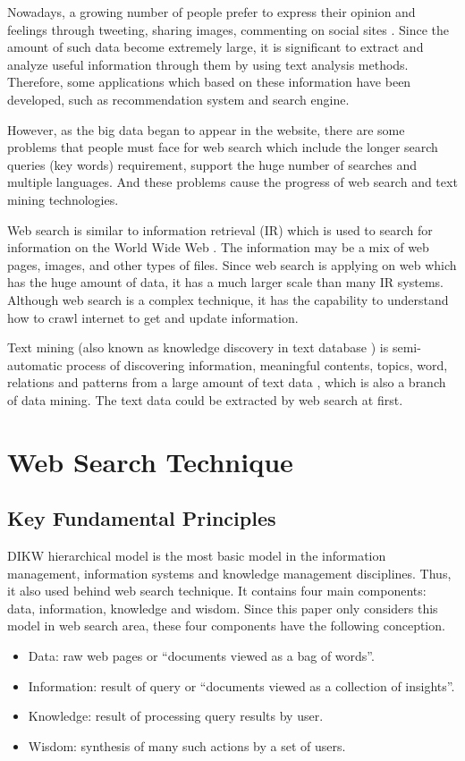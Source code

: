 \documentclass[sigconf]{acmart}
\begin{document}
Nowadays, a growing number of people prefer to express their opinion and feelings through tweeting, sharing images, commenting on social sites \cite{editor01}. Since the amount of such data become extremely large, it is significant to extract and analyze useful information through them by using text analysis methods. Therefore, some applications which based on these information have been developed, such as recommendation system and search engine.

However, as the big data began to appear in the website, there are some problems that people must face for web search which include the longer search queries (key words) requirement, support the huge number of searches and multiple languages. And these problems cause the progress of web search and text mining technologies.

Web search is similar to information retrieval (IR) which is used to search for information on the World Wide Web \cite{editor05}. The information may be a mix of web pages, images, and other types of files. Since web search is applying on web which has the huge amount of data, it has a much larger scale than many IR systems. Although web search is a complex technique, it has the capability to understand how to crawl internet to get and update information.

Text mining (also known as knowledge discovery in text database \cite{editor04}) is semi-automatic process of discovering information, meaningful contents, topics, word, relations and patterns from a large amount of text data \cite{editor01}, which is also a branch of data mining. The text data could be extracted by web search at first.

\section{Web Search Technique}

\subsection{Key Fundamental Principles}

DIKW hierarchical model is the most basic model in the information management, information systems and knowledge management disciplines. Thus, it also used behind web search technique. It contains four main components: data, information, knowledge and wisdom. Since this paper only considers this model in web search area, these four components have the following conception.
\begin{itemize}
\item Data: raw web pages or ``documents viewed as a bag of words''.
\item Information: result of query or ``documents viewed as a collection of insights''.
\item Knowledge: result of processing query results by user.
\item Wisdom: synthesis of many such actions by a set of users.
\end{itemize}
\end{document}
